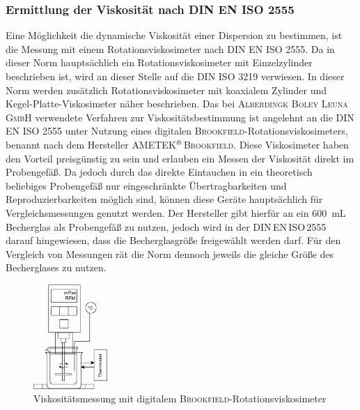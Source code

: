 \subsubsection{Ermittlung der Viskosität nach DIN EN ISO 2555}
Eine Möglichkeit die dynamische Viskosität einer Dispersion zu bestimmen, ist die Messung mit einem Rotationsviskosimeter nach DIN EN ISO 2555. Da in dieser Norm hauptsächlich ein Rotationsviskosimeter mit Einzelzylinder beschrieben ist, wird an dieser Stelle auf die DIN ISO 3219 verwiesen. In dieser Norm werden zusätzlich Rotationsviskosimeter mit koaxialem Zylinder und Kegel-Platte-Viskosimeter näher beschrieben. \cite{DINDeutschesInstitutfurNormunge.V..Februar2013, DINDeutschesInstitutfurNormunge.V..September2018} \linebreak
Das bei \textsc{Alberdingk Boley Leuna GmbH} verwendete Verfahren zur Viskositätsbestimmung ist angelehnt an die DIN EN ISO 2555 unter Nutzung eines digitalen \textsc{Brookfield}-Rotationsviskosimeters, benannt nach dem Hersteller \textsc{AMETEK$^\text{\textregistered}$\,Brookfield}. Diese Viskosimeter haben den Vorteil preisgünstig zu sein und erlauben ein Messen der Viskosität direkt im Probengefäß. Da jedoch durch das direkte Eintauchen in ein theoretisch beliebiges Probengefäß nur eingeschränkte Übertragbarkeiten und Reproduzierbarkeiten möglich sind, können diese Geräte hauptsächlich für Vergleichsmessungen genutzt werden.  Der Hersteller gibt hierfür an ein \SI{600}{\milli \liter} Becherglas als Probengefäß zu nutzen, jedoch wird in der DIN\,EN\,ISO\,2555 darauf hingewiesen, dass die Becherglasgröße freigewählt werden darf. Für den Vergleich von Messungen rät die Norm dennoch jeweils die gleiche Größe des Becherglases zu nutzen. \cite{ROMPPRedaktion.2008, brookfield_31.01.2022, DINDeutschesInstitutfurNormunge.V..September2018}


\begin{figure}[h!]
	\centering
	\includegraphics[width=0.25\textwidth]{img/viskosimeter}
	\caption{Viskositätsmessung mit digitalem \textsc{Brookfield}-\linebreak Rotationsviskosimeter}
	\label{fig: viskosimeter}
\end{figure}
\FloatBarrier

